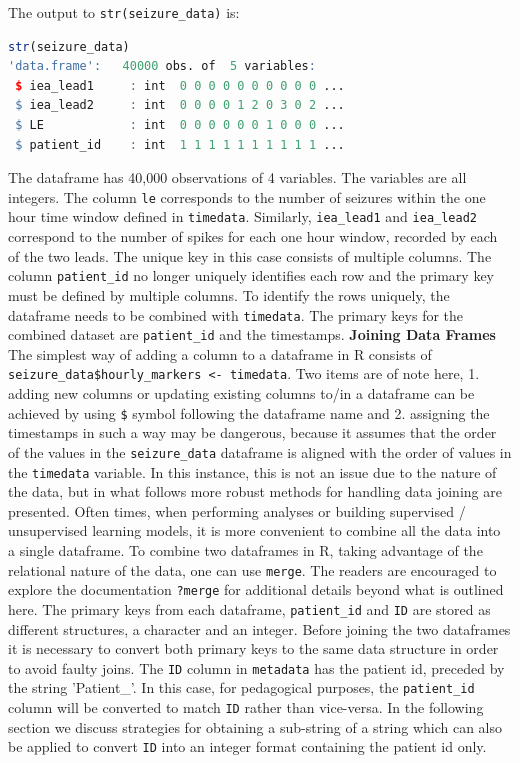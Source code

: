 The output to \verb|str(seizure_data)| is:
\begin{lstlisting}[language=R]
str(seizure_data)
'data.frame':	40000 obs. of  5 variables:
 $ iea_lead1     : int  0 0 0 0 0 0 0 0 0 0 ...
 $ iea_lead2     : int  0 0 0 0 1 2 0 3 0 2 ...
 $ LE            : int  0 0 0 0 0 0 1 0 0 0 ...
 $ patient_id    : int  1 1 1 1 1 1 1 1 1 1 ...
\end{lstlisting}
The dataframe has 40,000 observations of 4 variables. The variables are all integers. The column \verb|le| corresponds to the number of seizures within the one hour time window defined in \verb|timedata|. Similarly, \verb|iea_lead1| and \verb|iea_lead2| correspond to the number of spikes for each one hour window, recorded by each of the two leads. The unique key in this case consists of multiple columns. The column \verb|patient_id| no longer uniquely identifies each row and the primary key must be defined by multiple columns. To identify the rows uniquely, the dataframe needs to be combined with \verb|timedata|. The primary keys for the combined dataset are \verb|patient_id| and the timestamps.
\newline
\newline
\textbf{Joining Data Frames}
\newline
\newline
The simplest way of adding a column to a dataframe in R consists of \verb|seizure_data$hourly_markers <- timedata|. Two items are of note here, 1. adding new columns or updating existing columns to/in a dataframe can be achieved by using \verb|$| symbol following the dataframe name and 2. assigning the timestamps in such a way may be dangerous, because it assumes that the order of the values in the \verb|seizure_data| dataframe is aligned with the order of values in the \verb|timedata| variable. In this instance, this is not an issue due to the nature of the data, but in what follows more robust methods for handling data joining are presented.
Often times, when performing analyses or building supervised / unsupervised learning models, it is more convenient to combine all the data into a single dataframe. To combine two dataframes in R, taking advantage of the relational nature of the data, one can use \verb|merge|. The readers are encouraged to explore the documentation \verb|?merge| for additional details beyond what is outlined here. The primary keys from each dataframe, \verb|patient_id| and \verb|ID| are stored as different structures, a character and an integer. Before joining the two dataframes it is necessary to convert both primary keys to the same data structure in order to avoid faulty joins. The \verb|ID| column in \verb|metadata| has the patient id, preceded by the string 'Patient\_'. In this case, for pedagogical purposes, the \verb|patient_id| column will be converted to match \verb|ID| rather than vice-versa. In the following section we discuss strategies for obtaining a sub-string of a string which can also be applied to convert \verb|ID| into an integer format containing the patient id only.
